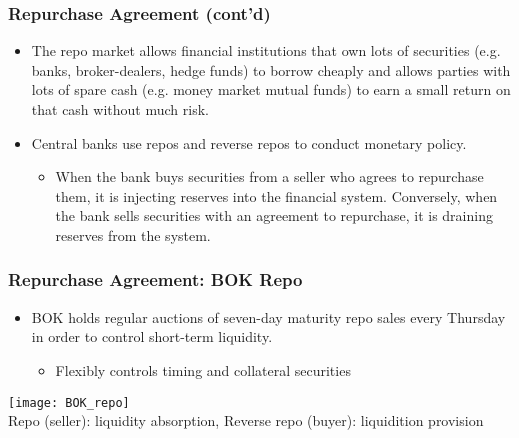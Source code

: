 \documentclass[10pt]{beamer}
\begin{document}
	
	
	
	
	\begin{frame}
		\frametitle{Repurchase Agreement (cont'd)}
		
		\begin{itemize}  \vspace{5pt} \itemsep10pt
			\item The repo market allows financial institutions that own lots of securities (e.g. banks, broker-dealers, hedge funds) to borrow cheaply and allows parties with lots of spare cash (e.g. money market mutual funds) to earn a small return on that cash without much risk. 
			\item Central banks use repos and reverse repos to conduct monetary policy. 
			\begin{itemize}  \vspace{5pt} \itemsep10pt
				\item When the bank buys securities from a seller who agrees to repurchase them, it is injecting reserves into the financial system. Conversely, when the bank sells securities with an agreement to repurchase, it is draining reserves from the system. 
			\end{itemize}
			
		\end{itemize}
		
	\end{frame}
	
	
	
	\begin{frame}
		\frametitle{Repurchase Agreement: BOK Repo}
		
		\begin{itemize}  \vspace{5pt} \itemsep10pt
			\item BOK holds regular auctions of seven-day maturity
			repo sales every Thursday in order to control short-term liquidity. 
			\begin{itemize}  \vspace{5pt} \itemsep10pt
				\item Flexibly controls timing and collateral securities
			\end{itemize}			
		\end{itemize}		
		
		\begin{center}
			\texttt{[image: BOK\_repo]} \\
			{\scriptsize Repo (seller): liquidity absorption, Reverse repo (buyer): liquidition provision}
		\end{center}		
		
	\end{frame}
	
\end{document}
